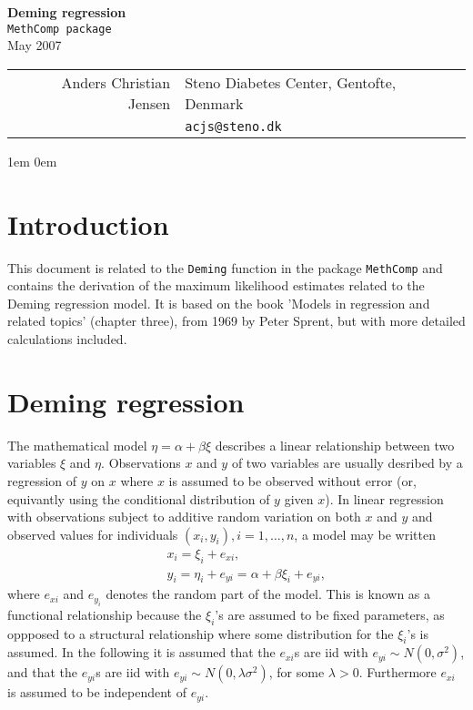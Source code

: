 \documentclass[a4paper,twoside,12pt]{article}
\begin{document}
\raggedleft
\pagestyle{empty}
\Huge 
{\bf Deming regression}\\[3mm]
\large
\texttt{MethComp package}\\[1em]
May 2007
\small
\vfill
\noindent
\raggedleft
\begin{tabular}{rl}
Anders Christian Jensen
  & Steno Diabetes Center, Gentofte, Denmark\\
  & \texttt{acjs@steno.dk}
\end{tabular}\hfill
\normalsize
\newpage
\tableofcontents
\newpage
\raggedright
\parindent 1em
\parskip 0em
\pagestyle{fancy}
\renewcommand{\sectionmark}[1]{\markboth{\thesection #1}{\thesection \ #1}}
\fancyhead[ER]{\sl \rightmark}
\fancyhead[EL,OR]{\bf \thepage}
\fancyfoot{}
\renewcommand{\headrulewidth}{0.1pt}
\setcounter{tocdepth}{3}
\setcounter{page}{1}
\section{Introduction}
This document is related to the \texttt{Deming} function in the
package \texttt{MethComp} and contains the derivation of the maximum
likelihood estimates related to the Deming regression model. It is
based on the book 'Models in regression and related topics' (chapter
three), from 1969 by Peter Sprent, but with more detailed calculations
included.
\section{Deming regression}
The mathematical model $\eta=\alpha+\beta\xi$ describes a linear
relationship between two variables $\xi$ and $\eta$. Observations $x$
and $y$ of two variables are usually desribed by a regression of $y$
on $x$ where $x$ is assumed to be observed without error (or,
equivantly using the conditional distribution of $y$ given $x$). In
linear regression with observations subject to additive random
variation on both $x$ and $y$ and observed values for individuals
$(x_i,y_i), i=1,\ldots,n$, a model may be written
\begin{eqnarray*}
  &&x_i=\xi_i+e_{xi},\\[1em]
&&y_i=\eta_i+e_{yi}=\alpha+\beta\xi_i+e_{yi},
\end{eqnarray*}
where $e_{xi}$ and $e_{y_i}$ denotes the random part of the model.
This is known as a functional relationship because the $\xi_i$'s are
assumed to be fixed parameters, as oppposed to a structural
relationship where some distribution for the $\xi_i$'s is assumed. In
the following it is assumed that the $e_{xi}$s are iid with
$e_{yi}\sim N(0,\sigma^2)$, and that the $e_{yi}$s are iid with
$e_{yi} \sim N(0,\lambda\sigma^2)$, for some $\lambda>0$. Furthermore
$e_{xi}$ is assumed to be independent of $e_{yi}$.
\end{document}
